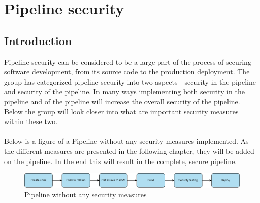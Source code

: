 \chapter{Pipeline security}
\section{Introduction}
Pipeline security can be considered to be a large part of the process of securing software development, from its source code to the production deployment. The group has categorized pipeline security into two aspects - security in the pipeline and security of the pipeline. In many ways implementing both security in the pipeline and of the pipeline will increase the overall security of the pipeline. Below the group will look closer into what are important security measures within these two. 
\\~\\
Below is a figure of a \gls{Pipeline} without any security measures implemented. As the different measures are presented in the following chapter, they will be added on the pipeline. In the end this will result in the complete, secure pipeline.

\vspace{2mm}
\begin{figure}[H]
    \centering
    \includegraphics[width=0.8\columnwidth]{Images/SecurePipeline-Page-3.drawio.png}
    \caption{Pipeline without any security measures}
    \label{fig: Pipeline without any security measures}
\end{figure}



